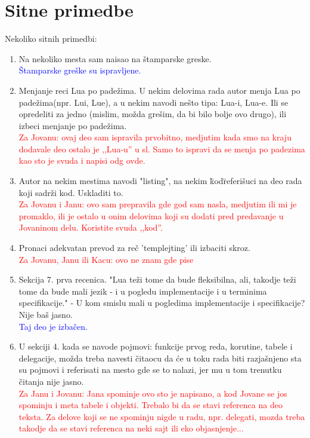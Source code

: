 \documentclass[a4paper]{report}
\newcommand{\odgovorAutora}[1]{\textcolor{blue}{#1}}
\newcommand{\note}[1]{\textcolor{red}{#1}}
\begin{document}
\section{Sitne primedbe}
Nekoliko sitnih primedbi:
\begin{enumerate}
  \item Na nekoliko mesta sam naisao na \v stamparske greske. \\
  \odgovorAutora{Štamparske greške su ispravljene.}
  \item Menjanje reci Lua po pade\v zima. U nekim delovima rada autor menja Lua po pade\v zima(npr. Lui, Lue), a u nekim navodi ne\v sto tipa: Lua-i, Lua-e. Ili se opredeliti za jedno (mislim, mo\v zda gre\v sim, da bi bilo bolje ovo drugo), ili izbeci menjanje po pade\v zima. \\
  \note{Za Jovanu: ovaj deo sam ispravila prvobitno, medjutim kada smo na kraju dodavale deo ostalo je ,,Lua-u'' u sl. Samo to ispravi da se menja po padezima kao sto je svuda i napisi odg ovde.}
  \item Autor na nekim mestima navodi "listing", na nekim \"kod\"  referi\v suci na deo rada koji sadr\v zi kod. Uskladiti to. \\
  \note{Za Jovanu i Janu: ovo sam prepravila gde god sam nasla, medjutim ili mi je promaklo, ili je ostalo u onim delovima koji su dodati pred predavanje u Jovaninom delu. Koristite svuda ,,kod''.}
  \item Pronaci adekvatan prevod za re\v c 'templejting'  ili izbaciti skroz. \\
  \note{Za Jovanu, Janu ili Kacu: ovo ne znam gde pise}
  \item Sekcija 7. prva recenica. "Lua te\v zi tome da bude fleksibilna, ali, takodje te\v zi tome da bude mali
jezik - i u pogledu implementacije i u terminima specifikacije." - U kom smislu mali u pogledima implementacije i specifikacije? Nije ba\v s jasno. \\
  \odgovorAutora{Taj deo je izbačen.}
  \item U sekciji 4. kada se navode pojmovi: funkcije prvog reda, korutine, tabele i delegacije, mo\v zda treba navesti \v citaocu da \' ce u toku rada biti razja\v snjeno sta su pojmovi i referisati na mesto gde se to nalazi, jer mu u tom trenutku \v citanja nije jasno. \\
  \note{Za Janu i Jovanu: Jana spominje ovo sto je napisano, a kod Jovane se jos spominju i meta tabele i objekti. Trebalo bi da se stavi referenca na deo teksta. Za delove koji se ne spominju nigde u radu, npr. delegati, mozda treba takodje da se stavi referenca na neki sajt ili eko objasnjenje...}

\end{enumerate}
\end{document}
